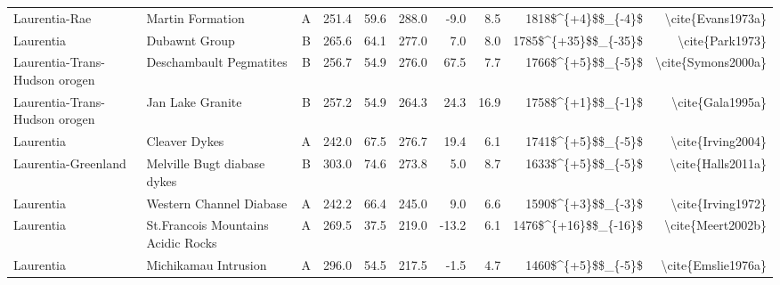 \begin{longtable}{p{1 in}p{1 in}rrrrrrrr}
                 Laurentia-Rae &                                 Martin Formation &      A &     251.4 &      59.6 & 288.0 &  -9.0 &       8.5 &     1818\$\textasciicircum \{+4\}\$\$\_\{-4\}\$ &                                  \textbackslash cite\{Evans1973a\} \\
                     Laurentia &                                    Dubawnt Group &      B &     265.6 &      64.1 & 277.0 &   7.0 &       8.0 &   1785\$\textasciicircum \{+35\}\$\$\_\{-35\}\$ &                                    \textbackslash cite\{Park1973\} \\
 Laurentia-Trans-Hudson orogen &                          Deschambault Pegmatites &      B &     256.7 &      54.9 & 276.0 &  67.5 &       7.7 &     1766\$\textasciicircum \{+5\}\$\$\_\{-5\}\$ &                                 \textbackslash cite\{Symons2000a\} \\
 Laurentia-Trans-Hudson orogen &                                 Jan Lake Granite &      B &     257.2 &      54.9 & 264.3 &  24.3 &      16.9 &     1758\$\textasciicircum \{+1\}\$\$\_\{-1\}\$ &                                   \textbackslash cite\{Gala1995a\} \\
                     Laurentia &                                    Cleaver Dykes &      A &     242.0 &      67.5 & 276.7 &  19.4 &       6.1 &     1741\$\textasciicircum \{+5\}\$\$\_\{-5\}\$ &                                  \textbackslash cite\{Irving2004\} \\
           Laurentia-Greenland &                      Melville Bugt diabase dykes &      B &     303.0 &      74.6 & 273.8 &   5.0 &       8.7 &     1633\$\textasciicircum \{+5\}\$\$\_\{-5\}\$ &                                  \textbackslash cite\{Halls2011a\} \\
                     Laurentia &                          Western Channel Diabase &      A &     242.2 &      66.4 & 245.0 &   9.0 &       6.6 &     1590\$\textasciicircum \{+3\}\$\$\_\{-3\}\$ &                                  \textbackslash cite\{Irving1972\} \\
                     Laurentia &               St.Francois Mountains Acidic Rocks &      A &     269.5 &      37.5 & 219.0 & -13.2 &       6.1 &   1476\$\textasciicircum \{+16\}\$\$\_\{-16\}\$ &                                  \textbackslash cite\{Meert2002b\} \\
                     Laurentia &                             Michikamau Intrusion &      A &     296.0 &      54.5 & 217.5 &  -1.5 &       4.7 &     1460\$\textasciicircum \{+5\}\$\$\_\{-5\}\$ &                                 \textbackslash cite\{Emslie1976a\} \\

\end{longtable}
